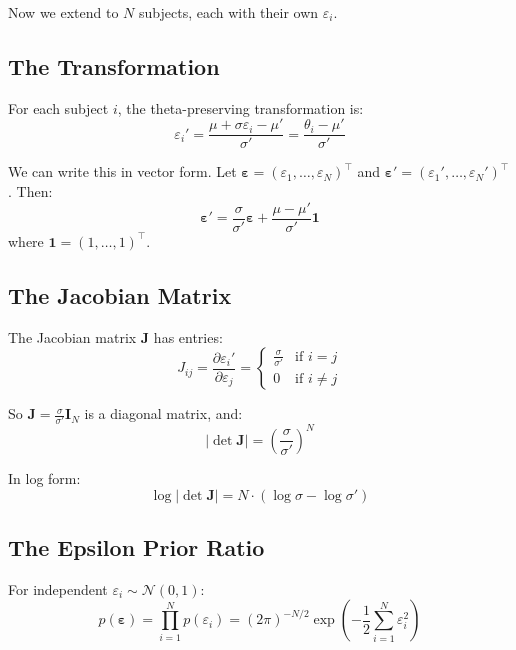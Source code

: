 \documentclass[11pt,a4paper]{article}
\theoremstyle{definition}
\newcommand{\eps}{\varepsilon}
\newcommand{\Normal}{\mathcal{N}}
\begin{document}
Now we extend to $N$ subjects, each with their own $\eps_i$.

\subsection{The Transformation}

For each subject $i$, the theta-preserving transformation is:
\begin{equation}
    \eps_i' = \frac{\mu + \sigma \eps_i - \mu'}{\sigma'} = \frac{\theta_i - \mu'}{\sigma'}
\end{equation}

We can write this in vector form. Let $\bm{\eps} = (\eps_1, \ldots, \eps_N)^\top$ and
$\bm{\eps}' = (\eps_1', \ldots, \eps_N')^\top$. Then:
\begin{equation}
    \bm{\eps}' = \frac{\sigma}{\sigma'} \bm{\eps} + \frac{\mu - \mu'}{\sigma'} \bm{1}
\end{equation}
where $\bm{1} = (1, \ldots, 1)^\top$.

\subsection{The Jacobian Matrix}

The Jacobian matrix $\bm{J}$ has entries:
\begin{equation}
    J_{ij} = \frac{\partial \eps_i'}{\partial \eps_j} =
    \begin{cases}
        \frac{\sigma}{\sigma'} & \text{if } i = j \\
        0 & \text{if } i \neq j
    \end{cases}
\end{equation}

So $\bm{J} = \frac{\sigma}{\sigma'} \bm{I}_N$ is a diagonal matrix, and:
\begin{equation}
    \boxed{|\det \bm{J}| = \left(\frac{\sigma}{\sigma'}\right)^N}
    \label{eq:jacobian_multi}
\end{equation}

In log form:
\begin{equation}
    \log |\det \bm{J}| = N \cdot (\log \sigma - \log \sigma')
\end{equation}

\subsection{The Epsilon Prior Ratio}

For independent $\eps_i \sim \Normal(0, 1)$:
\begin{equation}
    p(\bm{\eps}) = \prod_{i=1}^N p(\eps_i) = (2\pi)^{-N/2} \exp\left(-\frac{1}{2}\sum_{i=1}^N \eps_i^2\right)
\end{equation}
\end{document}
